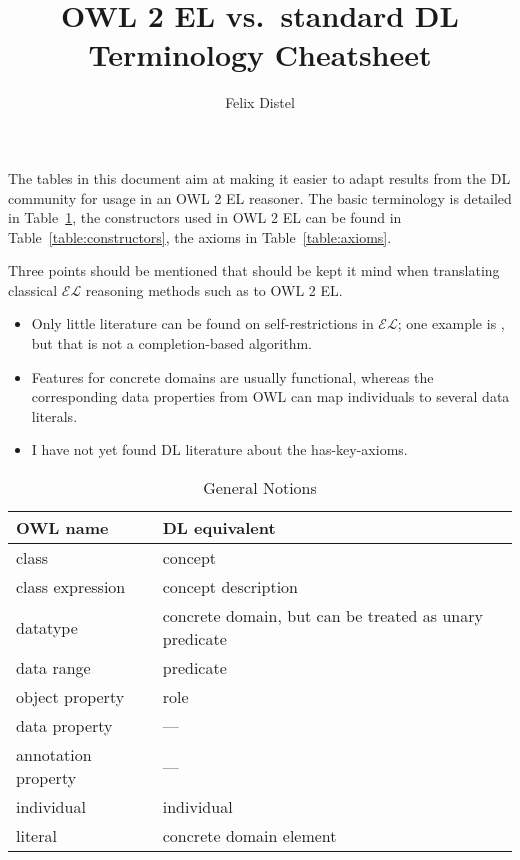 \documentclass{article}
\title{OWL 2 EL vs.\ standard DL Terminology Cheatsheet}
\author{Felix Distel}
\begin{document}
\maketitle

The tables in this document aim at making it easier to adapt results from
the DL community for usage in an OWL 2 EL reasoner. The basic terminology is
detailed in Table~\ref{table:general}, the constructors used in OWL 2 EL can be
found in Table~\ref{table:constructors}, the axioms in
Table~\ref{table:axioms}.

Three points should be mentioned that should be kept it mind when translating
classical $\mathcal{EL}$ reasoning methods such as
\cite{BaaderBrandtLutz-IJCAI-05,BBBM-NDJFL14,Sunt-09} to OWL 2 EL.
\begin{itemize}
  \item Only little literature can be found on self-restrictions in
    $\mathcal{EL}$; one example is \cite{carral2013towards}, but that is not a
    completion-based algorithm.
  \item Features for concrete domains are usually functional, whereas the
    corresponding data properties from OWL can map individuals to several data
    literals.
  \item I have not yet found DL literature about the has-key-axioms.
\end{itemize}

\begin{table}
  \caption{General Notions\label{table:general}}
  \begin{center}
    \begin{tabular}{@{}ll@{}}
      \toprule
      OWL name & DL equivalent \\
      \midrule
      class & concept \\
      class expression & concept description \\
      datatype & concrete domain, but can be treated as unary predicate \\
      data range & predicate\footnotemark[1]\\
      object property & role \\
      data property & ---\footnotemark[2]\\
      annotation property & --- \\
      individual & individual \\
      literal & concrete domain element \\
      \bottomrule
    \end{tabular}
  \end{center}
\end{table}
\end{document}
